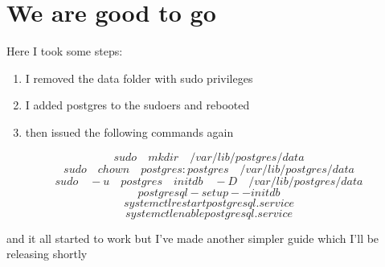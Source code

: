 \documentclass[a4paper,12pt]{article}
\begin{document}
\section { We are good to go }

Here I took some steps:

\begin{enumerate}
  \item I removed the data folder with sudo privileges
  \item I added postgres to the sudoers and rebooted
  \item then issued the following commands again
\end{enumerate}


\[ sudo \quad mkdir \quad /var/lib/postgres/data \]
\[ sudo \quad chown \quad postgres:postgres \quad /var/lib/postgres/data \]
\[ sudo \quad -u \quad postgres \quad initdb \quad -D \quad /var/lib/postgres/data \]
\[ postgresql-setup --initdb \]
\[ systemctl restart postgresql.service \]
\[ systemctl enable postgresql.service \]

and it all started to work but I've made another simpler guide which I'll be releasing shortly

\printindex
\end{document}
